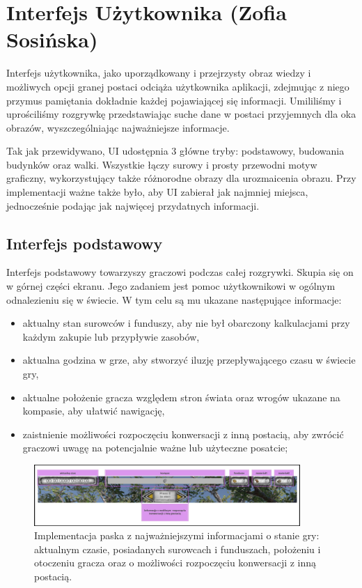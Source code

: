 \section{Interfejs Użytkownika (Zofia Sosińska)}\label{chap:ui_imp}
Interfejs użytkownika, jako uporządkowany i przejrzysty obraz wiedzy i możliwych opcji granej postaci odciąża użytkownika
aplikacji, zdejmując z niego przymus pamiętania dokładnie każdej pojawiającej się informacji. Umililiśmy i uprościliśmy 
rozgrywkę przedstawiając suche dane w postaci przyjemnych dla oka obrazów, wyszczególniając najważniejsze informacje.

Tak jak przewidywano, UI udostępnia 3 główne tryby: podstawowy, budowania budynków oraz walki. Wszystkie łączy surowy 
i prosty przewodni motyw graficzny, wykorzystujący także różnorodne obrazy dla urozmaicenia obrazu. Przy implementacji ważne także było, aby UI zabierał jak najmniej miejsca, jednocześnie podając jak 
najwięcej przydatnych informacji.

\subsection{Interfejs podstawowy}
Interfejs podstawowy towarzyszy graczowi podczas całej rozgrywki. Skupia się on w górnej części ekranu. Jego zadaniem jest pomoc 
użytkownikowi w ogólnym odnalezieniu się w świecie. W tym celu są mu ukazane następujące informacje:
\begin{itemize}
    \item aktualny stan surowców i funduszy, aby nie był obarczony kalkulacjami przy każdym zakupie lub przypływie zasobów,
    \item aktualna godzina w grze, aby stworzyć iluzję przepływającego czasu w świecie gry,
    \item aktualne położenie gracza względem stron świata oraz wrogów ukazane na kompasie, aby ułatwić nawigację,
    \item zaistnienie możliwości rozpoczęciu konwersacji z inną postacią, aby zwrócić graczowi uwagę na potencjalnie ważne lub użyteczne posatcie;
\end{itemize}

\begin{figure}[htbp]
    \centering
    \includegraphics[width=0.9\textwidth]{images/ui/naszpasek.png}
    \caption{Implementacja paska z najważniejszymi informacjami o stanie gry: aktualnym czasie, posiadanych surowcach 
    i funduszach, położeniu i otoczeniu gracza oraz o możliwości rozpoczęciu konwersacji z inną postacią.
    }\label{fig:compass}
\end{figure}


